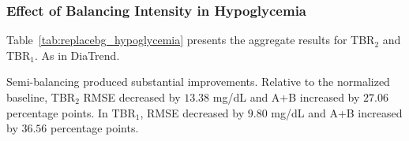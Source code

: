 \subsubsection{Effect of Balancing Intensity in Hypoglycemia}
\label{subsubsec:replacebg_semi_balancing}

Table~\ref{tab:replacebg_hypoglycemia} presents the aggregate results for TBR$_2$ and TBR$_1$. As in DiaTrend.

\begin{table}[htbp]
    \centering
    \caption{REPLACE-BG performance in the hypoglycemic ranges,
    averaged across balancing methods.}
    \label{tab:replacebg_hypoglycemia}
\end{table}

Semi-balancing produced substantial improvements. Relative to the normalized baseline, TBR$_2$ RMSE decreased by \(13.38\) mg/dL and A+B increased by \(27.06\) percentage points. In TBR$_1$, RMSE decreased by \(9.80\) mg/dL and A+B increased by \(36.56\) percentage points.

